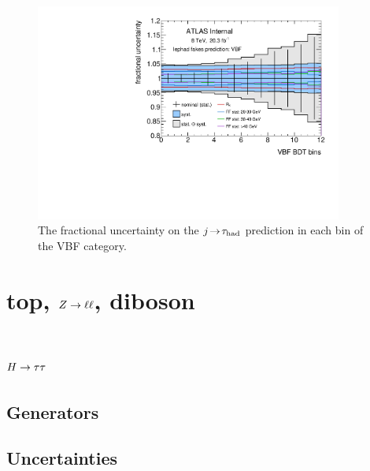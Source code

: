 \begin{figure}[tp]
  \includegraphics[width=0.90\textwidth]{figures/uncertainties/uncertainties_lephad_paper14_8TeV_fakes_VBF}
  \caption{The fractional uncertainty on the $j\!\rightarrow\!\tau_\text{had}$ prediction in each bin of the VBF category.}
  \label{fig:backgrounds-uncertainties-fakes}
\end{figure}

\clearpage

\section{top, $Z \rightarrow \ell\ell$, diboson}
\label{sec:backgrounds-others}

\section{$H\rightarrow\tau\tau$}
\label{sec:backgrounds-htautau}

\subsection{Generators}

\subsection{Uncertainties}

